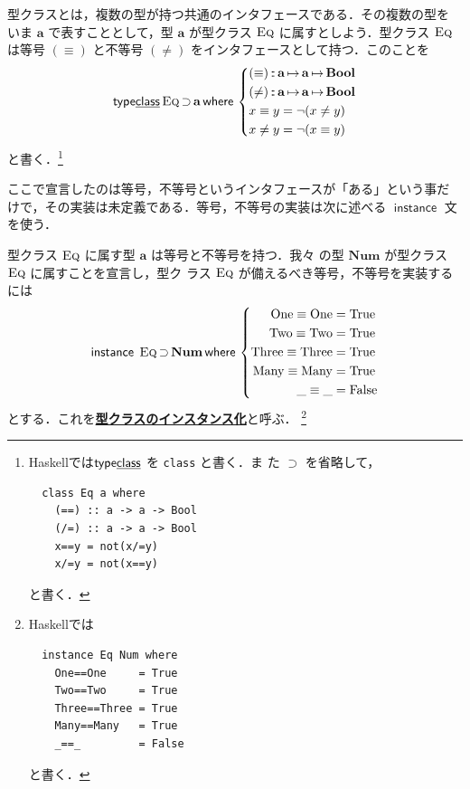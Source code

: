 \documentclass[a5paper,twoside,fleqn,draft]{jsbook}
\newcommand{\programminglanguage}[1]{\textsf{#1}}
\newcommand{\haskell}{\programminglanguage{Haskell}}
\newcommand{\keyword}[1]{{\underline{\textbf{#1}}}}
\newcommand{\code}[1]{\texttt{#1}}
\newcommand{\mKeyword}[1]{\mathsf{#1}} %
\newcommand{\mKeywordUnderline}[1]{\text{\underline{\textsf{#1}}}} %
\newcommand{\mInstanceKeyword}{\mKeyword{instance}}
\newcommand{\mTypeClassKeyword}{\mKeyword{type}\mKeywordUnderline{class}}
\newcommand{\mWhereKeyword}{\mKeyword{where}}
\DeclareMathOperator{\mInstance}{\mInstanceKeyword}
\DeclareMathOperator{\mSuperSet}{\supset}
\DeclareMathOperator{\mTypeClass}{\mTypeClassKeyword}
\DeclareMathOperator{\mWhere}{\mWhereKeyword}
\newcommand{\mConstant}[1]{\mathrm{#1}}
\newcommand{\mSpecialConstant}[1]{\textrm{#1}} %
\newcommand{\mFalse}{\mSpecialConstant{False}}
\newcommand{\mTrue}{\mSpecialConstant{True}}
\newcommand{\mAnyParam}{\_}
\DeclareMathOperator{\mIn}{{:\!:}}
\DeclareMathOperator{\mMapsTo}{\mapsto}
\newcommand{\mType}[1]{\mathbf{#1}}
\newcommand{\mBoolType}{\mType{Bool}}
\newcommand{\mGenericTypeClass}[1]{\textsc{#1}} %
\newcommand{\mEqTypeClass}{\mGenericTypeClass{Eq}}
\newcommand{\mProj}[2]{#1\mMapsTo#2}
\begin{document}
型クラスとは，複数の型が持つ共通のインタフェースである．その複数の型を
いま $\mType{a}$ で表すこととして，型 $\mType{a}$ が型クラス
$\mEqTypeClass$ に属すとしよう．型クラス $\mEqTypeClass$ は等号
$(\equiv)$ と不等号 $(\neq)$ をインタフェースとして持つ．このことを
\begin{equation}
  \mTypeClass\mathop{\mEqTypeClass}\mSuperSet\mType{a}\mWhere{}
  \left\{
  \begin{aligned}
    &(\equiv)\mIn\mProj{\mType{a}}{\mProj{\mType{a}}{\mBoolType}}\\
    &(\neq)\mIn\mProj{\mType{a}}{\mProj{\mType{a}}{\mBoolType}}\\
    &x\equiv y=\neg(x\neq y)\\
    &x\neq y=\neg(x\equiv y)
  \end{aligned}
  \right.
\end{equation}
と書く．\footnote{\haskell では$\mTypeClass$ を \code{class} と書く．ま
  た $\mSuperSet$ を省略して，
\begin{verbatim}
  class Eq a where
    (==) :: a -> a -> Bool
    (/=) :: a -> a -> Bool
    x==y = not(x/=y)
    x/=y = not(x==y)
\end{verbatim}
と書く．}

ここで宣言したのは等号，不等号というインタフェースが「ある」という事だ
けで，その実装は未定義である．等号，不等号の実装は次に述べる
$\mInstance$ 文を使う．

型クラス $\mEqTypeClass$ に属す型 $\mType{a}$ は等号と不等号を持つ．我々
の型 $\mType{Num}$ が型クラス $\mEqTypeClass$ に属すことを宣言し，型ク
ラス $\mEqTypeClass$ が備えるべき等号，不等号を実装するには
\begin{equation}
  \mInstance\;\mEqTypeClass\mSuperSet\mType{Num}
  \mWhere{}
  \left\{
  \begin{aligned}
    \mConstant{One}\equiv\mConstant{One}&=\mTrue\\
    \mConstant{Two}\equiv\mConstant{Two}&=\mTrue\\
    \mConstant{Three}\equiv\mConstant{Three}&=\mTrue\\
    \mConstant{Many}\equiv\mConstant{Many}&=\mTrue\\
    \mAnyParam\equiv\mAnyParam&=\mFalse
  \end{aligned}
  \right.
\end{equation}
とする．これを\keyword{型クラスのインスタンス化}と呼ぶ．
\footnote{\haskell では
\begin{verbatim}
  instance Eq Num where
    One==One     = True
    Two==Two     = True
    Three==Three = True
    Many==Many   = True
    _==_         = False
\end{verbatim}
と書く．}
\end{document}
